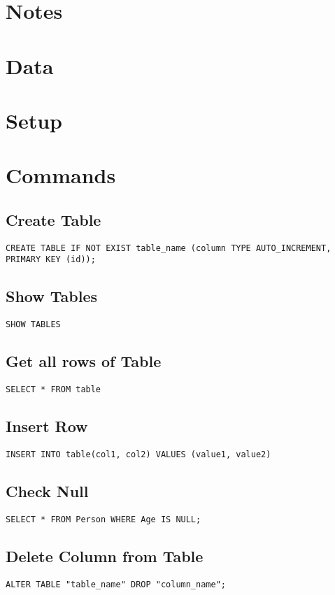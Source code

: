 \documentclass{article}
\title{\vspace{-2.25cm}{\small SQL}\vspace{-1.5cm}}
\date{}
\begin{document}
\maketitle
\begin{multicols}{3}
	
\section{Notes}
\section{Data}
\section{Setup}
\section{Commands}

\subsection{Create Table}
\lstinline|CREATE TABLE IF NOT EXIST table_name (column TYPE AUTO_INCREMENT, PRIMARY KEY (id));|

\subsection{Show Tables}
\lstinline|SHOW TABLES|

\subsection{Get all rows of Table}
\lstinline|SELECT * FROM table|

\subsection{Insert Row}
\lstinline|INSERT INTO table(col1, col2) VALUES (value1, value2)|

\subsection{Check Null}
\lstinline|SELECT * FROM Person WHERE Age IS NULL;|

\subsection{Delete Column from Table}
\lstinline|ALTER TABLE "table_name" DROP "column_name";|
\end{multicols}
\end{document}
